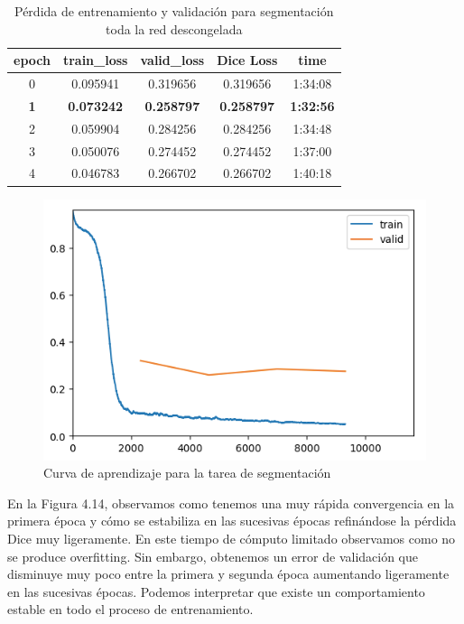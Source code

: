 \begin{table}[H]
	\centering
	\begin{tabular}{|ccccc|}
		\toprule
		epoch & train\_loss & valid\_loss & Dice Loss & time \\ 
		\midrule
		0 & 0.095941 & 0.319656 & 0.319656 & 1:34:08 \\ 
		\textbf{1} & \textbf{0.073242} & \textbf{0.258797} & \textbf{0.258797} & \textbf{1:32:56} \\ 
		2 & 0.059904 & 0.284256 & 0.284256 & 1:34:48 \\ 
		3 & 0.050076 & 0.274452 & 0.274452 & 1:37:00 \\ 
		4 & 0.046783 & 0.266702 & 0.266702 & 1:40:18 \\ 
		\bottomrule
	\end{tabular}
	\caption{Pérdida de entrenamiento y validación para segmentación toda la red descongelada}
	\label{tabla:resultados4}
\end{table}

\begin{figure}[H]
	\centering
	\includegraphics[width=0.7\linewidth]{imagenes/curva_segmentation.png}
	\caption{Curva de aprendizaje para la tarea de segmentación}
\end{figure}

En la Figura 4.14, observamos como tenemos una muy rápida convergencia en la primera época y cómo se estabiliza en las sucesivas épocas refinándose la pérdida Dice muy ligeramente. En este tiempo de cómputo limitado observamos como no se produce overfitting. Sin embargo, obtenemos un error de validación que disminuye muy poco entre la primera y segunda época aumentando ligeramente en las sucesivas épocas. Podemos interpretar que existe un comportamiento estable en todo el proceso de entrenamiento.

